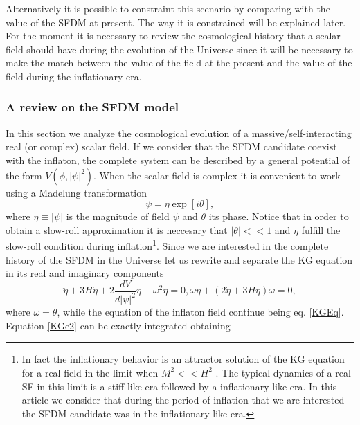 \documentclass[amssymb,twocolumn,prd,nofootinbib,showpacs]{revtex4-1}
\begin{document}
Alternatively it is possible to constraint this scenario by comparing with the value of the SFDM at present. The way it is constrained will be explained later. For the moment it is necessary to review the cosmological history that a scalar field should have during the evolution of the Universe since it will be necessary to make the match between the value of the field at the present and the value of the field during the inflationary era. 

\subsubsection{A review on the SFDM model}

In this section we analyze the cosmological evolution of a massive/self-interacting real (or complex) scalar field. If we consider that the SFDM candidate coexist with the inflaton, the complete system can be described by a general potential of the form $V(\phi,|\psi|^2)$. When the scalar field is complex it is convenient to work using a Madelung transformation \cite{madelung}
\begin{equation}
\psi = \eta \exp[i\theta],
\end{equation}
where $\eta\equiv |\psi|$ is the magnitude of field $\psi$ and $\theta$ its phase.
Notice that in order to obtain a slow-roll approximation it is neccesary that $|\theta|<<1$ and $\eta$ fulfill the slow-roll condition during inflation\footnote{In fact the inflationary behavior is an attractor solution of the KG equation for a real field in the limit when $M^2<<H^2$ \cite{atractorinf1,atractorinf2}. The typical dynamics of a real SF in this limit is a stiff-like era followed by a inflationary-like era. In this article we consider that during the period of inflation that we are interested the SFDM candidate was in the inflationary-like era.}.
Since we are interested in the complete history of the SFDM in the Universe let us rewrite and separate the KG equation in its real and imaginary components
\begin{subequations}\label{KESFDM}
\begin{equation}\label{KGe1}
\ddot\eta+3H\dot\eta+2\frac{dV}{d|\psi|^2}\eta-\omega^2\eta= 0,
\end{equation}
\begin{equation}\label{KGe2}
\dot\omega \eta + (2\dot\eta+3H\eta)\omega=0,
\end{equation}
\end{subequations}
where $\omega = \dot \theta$, while the equation of the inflaton field continue being eq. \eqref{KGEq}. Equation \eqref{KGe2} can be exactly integrated obtaining 
\end{document}
